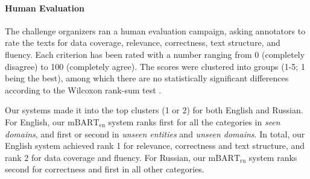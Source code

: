 \paragraph{Human Evaluation}

The challenge organizers ran a human evaluation campaign, asking annotators to rate the texts for data coverage, relevance, correctness, text structure, and fluency.  Each criterion has been rated with a number ranging from 0 (completely disagree) to 100 (completely agree). The scores were clustered into groups (1-5; 1 being the best), among which there are no statistically significant differences according to the Wilcoxon rank-sum test \citep{wilcoxon1992individual}.

Our systems made it into the top clusters (1 or 2) for both English and Russian. For English, our $\text{mBART}_{\text{en}}$ system ranks first for all the categories in \textit{seen domains}, and first or second in \textit{unseen entities} and \textit{unseen domains}. In total, our English system achieved rank 1 for relevance, correctness and text structure, and rank 2 for data coverage and fluency. For Russian, our $\text{mBART}_{\text{ru}}$ system ranks second for correctness and first in all other categories.



